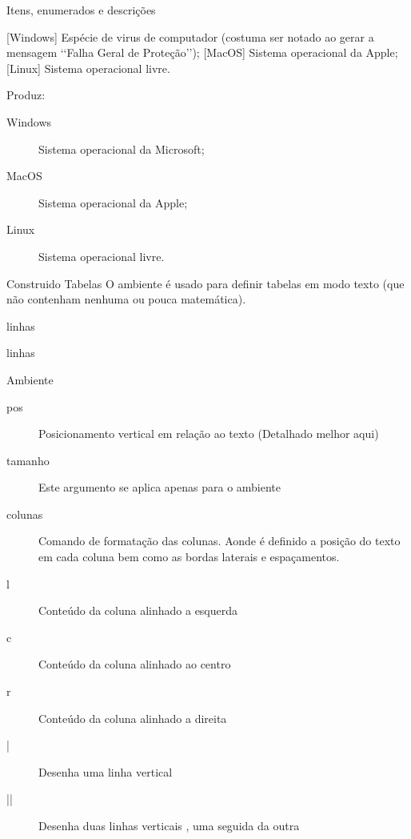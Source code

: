 \begin{frame}{Itens, enumerados e descrições}
\begin{LaTeXcode}
 \n
{} [Windows] Espécie de virus de computador
(costuma ser notado ao gerar a mensagem
`{}`Falha Geral de Proteção'{}'); \n
{} [MacOS] Sistema operacional da Apple; \n
{} [Linux] Sistema operacional livre. \n
{}
\end{LaTeXcode}

Produz:

\begin{LaTeXoutput}
\begin{description}
\item [Windows] Sistema operacional da Microsoft;
\item [MacOS] Sistema operacional da Apple;
\item [Linux] Sistema operacional livre.
\end{description}
\end{LaTeXoutput}
\end{frame}

\begin{frame}{Construido Tabelas}
O ambiente  é usado para definir tabelas em modo texto (que não contenham nenhuma ou pouca matemática).

\begin{LaTeXcode}[Sintaxe]
linhas \\

linhas \\
\end{LaTeXcode}
\end{frame}

\begin{frame}{Ambiente }
\begin{description}
	\item [pos] Posicionamento vertical em relação ao texto (Detalhado melhor aqui)
	\item [tamanho] Este argumento se aplica apenas para o ambiente %
	\item [colunas] Comando de formatação das colunas. Aonde é definido a posição do texto em cada coluna bem como as bordas laterais e espaçamentos.
\end{description}
	\begin{description}
	\item [l] Conteúdo da coluna alinhado a esquerda
	\item [c] Conteúdo da coluna alinhado ao centro
	\item [r] Conteúdo da coluna alinhado a direita
	\item [|] Desenha uma linha vertical
	\item [||] Desenha duas linhas verticais , uma seguida da outra
	\end{description}
\end{frame}

